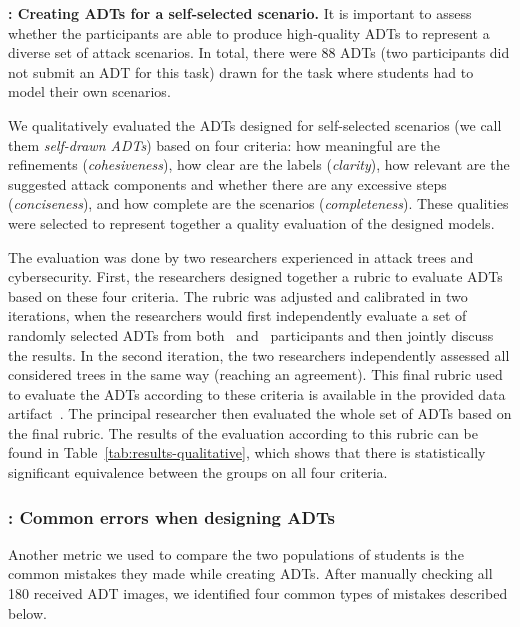 

\textbf{\hypothesis{\hypoThirdADTsub}: Creating ADTs for a self-selected scenario.}
It is important to assess whether the participants are able to produce high-quality ADTs to represent a diverse set of attack scenarios. In total, there were 88 ADTs (two participants did not submit an ADT for this task) drawn for the task where students had to model their own scenarios. 

We qualitatively evaluated the ADTs designed for self-selected scenarios (we call them \emph{self-drawn ADTs}) based on four criteria: how meaningful are the refinements (\emph{cohesiveness}), how clear are the labels (\emph{clarity}), how relevant are the suggested attack components and whether there are any excessive steps (\emph{conciseness}), and how complete are the scenarios (\emph{completeness}). These qualities were selected to represent together a quality evaluation of the designed models. 

 The evaluation was done by two researchers experienced in attack trees and cybersecurity. First, the researchers designed together a rubric to evaluate ADTs based on these four criteria. The rubric was adjusted and calibrated in two iterations, when the researchers would first independently evaluate a set of randomly selected ADTs from both \ICS\ and \SEC\ participants and then jointly discuss the results. In the second iteration, the two researchers independently assessed all considered trees in the same way (reaching an agreement).  This final rubric used to evaluate the ADTs according to these criteria is available in the provided data artifact~\cite{zenodo-dataset}. The principal researcher then evaluated the whole set of ADTs based on the final rubric. The results of the evaluation according to this rubric can be found in Table~\ref{tab:results-qualitative}, which shows that there is statistically significant equivalence between the groups on all four criteria.
 



\subsubsection{\hypothesis{\hypoErrorAmount}: Common errors when designing ADTs}
\label{ssec:results-common-errors}

Another metric we used to compare the two populations of students is the common mistakes they made while creating ADTs. After manually checking all 180 received ADT images, we identified four common types of mistakes described below.


